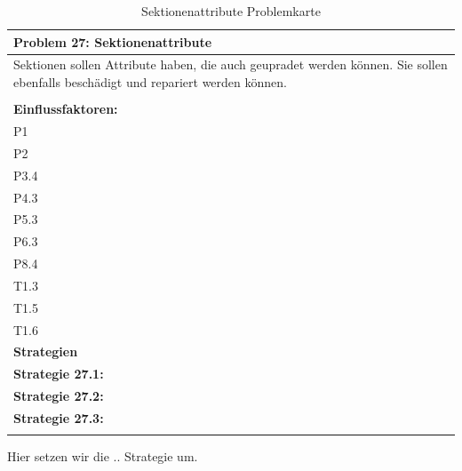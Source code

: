 \documentclass[fontsize=12pt,paper=a4,twoside]{scrartcl}
\begin{document}
\begin{table}[H]
    \centering
    \begin{tabular}{|p{15cm}|}
    \hline
          \textbf{Problem 27: Sektionenattribute}  \\ \hline
	Sektionen sollen Attribute haben, die auch geupradet werden können. Sie sollen ebenfalls beschädigt und repariert werden können. \\
         \\ \hline
          \textbf{Einflussfaktoren: } \\
	P1 \\
	P2 \\
	P3.4 \\
	P4.3 \\
	P5.3 \\
	P6.3 \\
	P8.4 \\
	T1.3 \\
	T1.5 \\
	T1.6 \\
          \hline
          \textbf{Strategien} \\ \hline
            {}          
           \label{strategie:27.1}     
          \textbf{Strategie 27.1:}  \\        
  {}          
           \label{strategie:27.2}              
          \textbf{Strategie 27.2:}  \\
	 {}          
           \label{strategie:27.3}     
          \textbf{Strategie 27.3: }  \\ 
	 \\ \hline
    \end{tabular}

    \caption{Sektionenattribute Problemkarte}
    \label{tab:ProblemKarte27}
\end{table}
Hier setzen wir die .. Strategie um.\\
\end{document}

